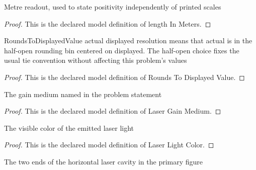 \begin{definition}
  \label{def:physics:phyx-mini-0245:phyxminiproblems-problemphyxmini0245-lengthinmeters}
  Metre readout, used to state positivity independently of printed scales
\end{definition}
\begin{proof}
  This is the declared model definition of length In Meters.
\end{proof}
\begin{definition}
  \label{def:physics:phyx-mini-0245:phyxminiproblems-problemphyxmini0245-roundstodisplayedvalue}
  RoundsToDisplayedValue actual displayed resolution means that actual is in the half-open rounding bin centered on displayed. The half-open choice fixes the usual tie convention without affecting this problem's values
\end{definition}
\begin{proof}
  This is the declared model definition of Rounds To Displayed Value.
\end{proof}
\begin{definition}
  \label{def:physics:phyx-mini-0245:phyxminiproblems-problemphyxmini0245-lasergainmedium}
  The gain medium named in the problem statement
\end{definition}
\begin{proof}
  This is the declared model definition of Laser Gain Medium.
\end{proof}
\begin{definition}
  \label{def:physics:phyx-mini-0245:phyxminiproblems-problemphyxmini0245-laserlightcolor}
  The visible color of the emitted laser light
\end{definition}
\begin{proof}
  This is the declared model definition of Laser Light Color.
\end{proof}
\begin{definition}
  \label{def:physics:phyx-mini-0245:phyxminiproblems-problemphyxmini0245-cavityend}
  The two ends of the horizontal laser cavity in the primary figure
\end{definition}
